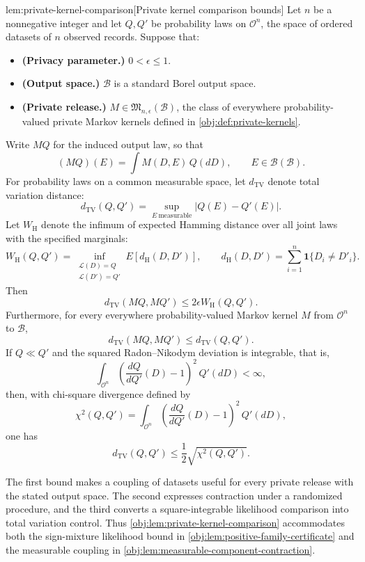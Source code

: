 \begin{lemmav}{lem:private-kernel-comparison}[Private kernel comparison bounds]
Let \(n\) be a nonnegative integer and let \(Q,Q'\) be probability laws on \(\mathcal O^n\), the space of ordered datasets of \(n\) observed records. Suppose that:
\begin{itemize}
\item \textbf{(Privacy parameter.)} \(0<\epsilon\le 1\).
\item \textbf{(Output space.)} \(\mathcal B\) is a standard Borel output space.
\item \textbf{(Private release.)} \(M\in\mathfrak M_{n,\epsilon}(\mathcal B)\), the class of everywhere probability-valued private Markov kernels defined in \cref{obj:def:private-kernels}.
\end{itemize}
Write \(MQ\) for the induced output law, so that
\[
(MQ)(E)=\int M(D,E)\,Q(dD),
\qquad E\in\mathcal B(\mathcal B).
\]
For probability laws on a common measurable space, let \(d_{\mathrm{TV}}\) denote total variation distance:
\[
d_{\mathrm{TV}}(Q,Q')=\sup_{E\ \mathrm{measurable}}|Q(E)-Q'(E)|.
\]
Let \(W_{\mathrm H}\) denote the infimum of expected Hamming distance over all joint laws with the specified marginals:
\[
W_{\mathrm H}(Q,Q')
=
\inf_{\substack{\mathcal L(D)=Q\\\mathcal L(D')=Q'}}
E\!\left[d_{\mathrm H}(D,D')\right],
\qquad
d_{\mathrm H}(D,D')
=
\sum_{i=1}^{n}\mathbf 1\{D_i\ne D'_i\}.
\]
Then
\[
d_{\mathrm{TV}}(MQ,MQ')
\le 2\epsilon W_{\mathrm H}(Q,Q').
\]
Furthermore, for every everywhere probability-valued Markov kernel \(M\) from \(\mathcal O^n\) to \(\mathcal B\),
\[
d_{\mathrm{TV}}(MQ,MQ')\le d_{\mathrm{TV}}(Q,Q').
\]
If \(Q\ll Q'\) and the squared Radon--Nikodym deviation is integrable, that is,
\[
\int_{\mathcal O^n}
\left(\frac{dQ}{dQ'}(D)-1\right)^2\,Q'(dD)<\infty,
\]
then, with chi-square divergence defined by
\[
\chi^2(Q,Q')
=
\int_{\mathcal O^n}
\left(\frac{dQ}{dQ'}(D)-1\right)^2\,Q'(dD),
\]
one has
\[
d_{\mathrm{TV}}(Q,Q')
\le \frac12\sqrt{\chi^2(Q,Q')}.
\]
\end{lemmav}

The first bound makes a coupling of datasets useful for every private release with the stated output space. The second expresses contraction under a randomized procedure, and the third converts a square-integrable likelihood comparison into total variation control. Thus \cref{obj:lem:private-kernel-comparison} accommodates both the sign-mixture likelihood bound in \cref{obj:lem:positive-family-certificate} and the measurable coupling in \cref{obj:lem:measurable-component-contraction}.

